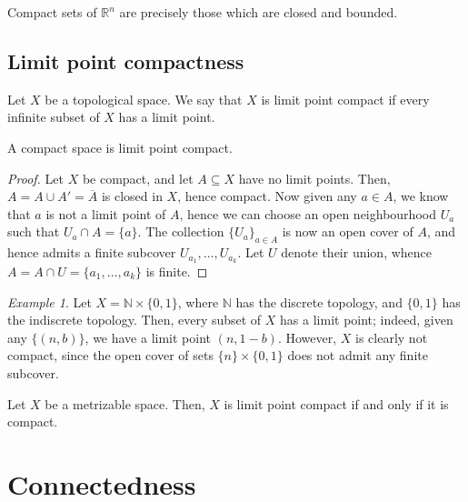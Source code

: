 \documentclass[11pt]{article}
\newcommand{\R}{\mathbb{R}}
\newcommand{\N}{\mathbb{N}}
\theoremstyle{definition}
\theoremstyle{remark}
\newtheorem*{example}{Example}
\numberwithin{equation}{section}
\begin{document}
    \begin{theorem}
        Compact sets of $\R^n$ are precisely those which are closed and bounded.        
    \end{theorem}


    \subsection{Limit point compactness}

    \begin{definition}
        Let $X$ be a topological space. We say that $X$ is limit point compact if
        every infinite subset of $X$ has a limit point.
    \end{definition}

    \begin{lemma}
        A compact space is limit point compact.
    \end{lemma}
    \begin{proof}
        Let $X$ be compact, and let $A \subseteq X$ have no limit points. Then, $A =
        A \cup A' = \overline{A}$ is closed in $X$, hence compact. Now given any $a
        \in A$, we know that $a$ is not a limit point of $A$, hence we can choose an
        open neighbourhood $U_a$ such that $U_a \cap A = \{a\}$. The collection
        $\{U_a\}_{a \in A}$ is now an open cover of $A$, and hence admits a finite
        subcover $U_{a_1}, \dots, U_{a_k}$. Let $U$ denote their union, whence $A = A
        \cap U = \{a_1, \dots, a_k\}$ is finite.
    \end{proof}
    \begin{example}
        Let $X = \N \times \{0, 1\}$, where $\N$ has the discrete topology, and $\{0,
        1\}$ has the indiscrete topology. Then, every subset of $X$ has a limit
        point; indeed, given any $\{(n, b)\}$, we have a limit point $(n, 1 - b)$.
        However, $X$ is clearly not compact, since the open cover of sets
        $\{n\}\times \{0, 1\}$ does not admit any finite subcover.
    \end{example}

    \begin{theorem}
        Let $X$ be a metrizable space. Then, $X$ is limit point compact if and only
        if it is compact.
    \end{theorem}


    \section{Connectedness}
    
\end{document}
